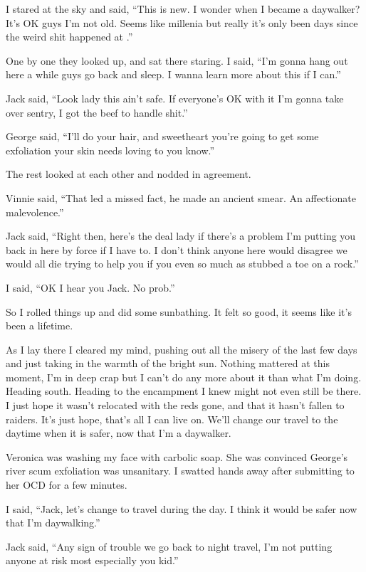 I stared at the sky and said, ``This is new. I wonder when I became a daywalker? It's OK guys I'm not old. Seems like millenia but really it's only been days since the weird shit happened at \chichenitza*.''

One by one they looked up, and sat there staring. I said, ``I'm gonna hang out here a while guys go back and sleep. I wanna learn more about this if I can.''

Jack said, ``Look lady this ain't safe. If everyone's OK with it I'm gonna take over sentry, I got the beef to handle shit.''

George said, ``I'll do your hair, and sweetheart you're going to get some exfoliation your skin needs loving to you know.''

The rest looked at each other and nodded in agreement.

Vinnie said, ``That led a missed fact, he made an ancient smear. An affectionate malevolence.''

Jack said, ``Right then, here's the deal lady if there's a problem I'm putting you back in here by force if I have to. I don't think anyone here would disagree we would all die trying to help you if you even so much as stubbed a toe on a rock.''

I said, ``OK I hear you Jack. No prob.''

So I rolled things up and did some sunbathing. It felt so good, it seems like it's been a lifetime.


As I lay there I cleared my mind, pushing out all the misery of the last few days and just taking in the warmth of the bright sun. Nothing mattered at this moment, I'm in deep crap but I can't do any more about it than what I'm doing. Heading south. Heading to the encampment I knew might not even still be there. I just hope it wasn't relocated with the reds gone, and that it hasn't fallen to raiders. It's just hope, that's all I can live on. 
We'll change our travel to the daytime when it is safer, now that I'm a daywalker. 

Veronica was washing my face with carbolic soap. She was convinced George's river scum exfoliation was unsanitary. I swatted hands away after submitting to her OCD for a few minutes.

I said, ``Jack, let's change to travel during the day. I think it would be safer now that I'm daywalking.''

Jack said, ``Any sign of trouble we go back to night travel, I'm not putting anyone at risk most especially you kid.''

